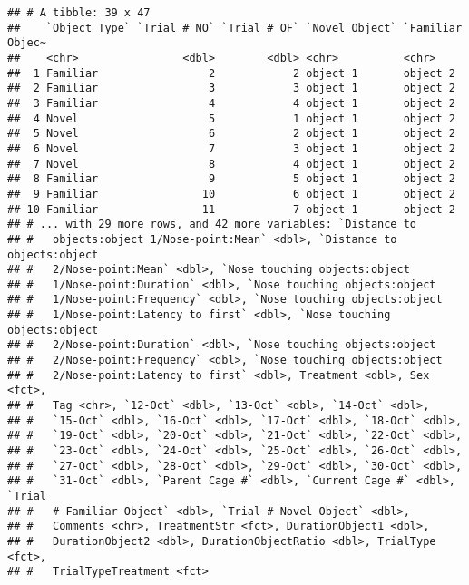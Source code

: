 \documentclass[]{article}
\newenvironment{Shaded}{\begin{snugshade}}{\end{snugshade}}
\newcommand{\KeywordTok}[1]{\textcolor[rgb]{0.13,0.29,0.53}{\textbf{#1}}}
\newcommand{\StringTok}[1]{\textcolor[rgb]{0.31,0.60,0.02}{#1}}
\newcommand{\CommentTok}[1]{\textcolor[rgb]{0.56,0.35,0.01}{\textit{#1}}}
\newcommand{\OperatorTok}[1]{\textcolor[rgb]{0.81,0.36,0.00}{\textbf{#1}}}
\newcommand{\NormalTok}[1]{#1}
\begin{document}
\begin{verbatim}
## # A tibble: 39 x 47
##    `Object Type` `Trial # NO` `Trial # OF` `Novel Object` `Familiar Objec~
##    <chr>                <dbl>        <dbl> <chr>          <chr>           
##  1 Familiar                 2            2 object 1       object 2        
##  2 Familiar                 3            3 object 1       object 2        
##  3 Familiar                 4            4 object 1       object 2        
##  4 Novel                    5            1 object 1       object 2        
##  5 Novel                    6            2 object 1       object 2        
##  6 Novel                    7            3 object 1       object 2        
##  7 Novel                    8            4 object 1       object 2        
##  8 Familiar                 9            5 object 1       object 2        
##  9 Familiar                10            6 object 1       object 2        
## 10 Familiar                11            7 object 1       object 2        
## # ... with 29 more rows, and 42 more variables: `Distance to
## #   objects:object 1/Nose-point:Mean` <dbl>, `Distance to objects:object
## #   2/Nose-point:Mean` <dbl>, `Nose touching objects:object
## #   1/Nose-point:Duration` <dbl>, `Nose touching objects:object
## #   1/Nose-point:Frequency` <dbl>, `Nose touching objects:object
## #   1/Nose-point:Latency to first` <dbl>, `Nose touching objects:object
## #   2/Nose-point:Duration` <dbl>, `Nose touching objects:object
## #   2/Nose-point:Frequency` <dbl>, `Nose touching objects:object
## #   2/Nose-point:Latency to first` <dbl>, Treatment <dbl>, Sex <fct>,
## #   Tag <chr>, `12-Oct` <dbl>, `13-Oct` <dbl>, `14-Oct` <dbl>,
## #   `15-Oct` <dbl>, `16-Oct` <dbl>, `17-Oct` <dbl>, `18-Oct` <dbl>,
## #   `19-Oct` <dbl>, `20-Oct` <dbl>, `21-Oct` <dbl>, `22-Oct` <dbl>,
## #   `23-Oct` <dbl>, `24-Oct` <dbl>, `25-Oct` <dbl>, `26-Oct` <dbl>,
## #   `27-Oct` <dbl>, `28-Oct` <dbl>, `29-Oct` <dbl>, `30-Oct` <dbl>,
## #   `31-Oct` <dbl>, `Parent Cage #` <dbl>, `Current Cage #` <dbl>, `Trial
## #   # Familiar Object` <dbl>, `Trial # Novel Object` <dbl>,
## #   Comments <chr>, TreatmentStr <fct>, DurationObject1 <dbl>,
## #   DurationObject2 <dbl>, DurationObjectRatio <dbl>, TrialType <fct>,
## #   TrialTypeTreatment <fct>
\end{verbatim}

\begin{Shaded}
\end{Shaded}
\end{document}
